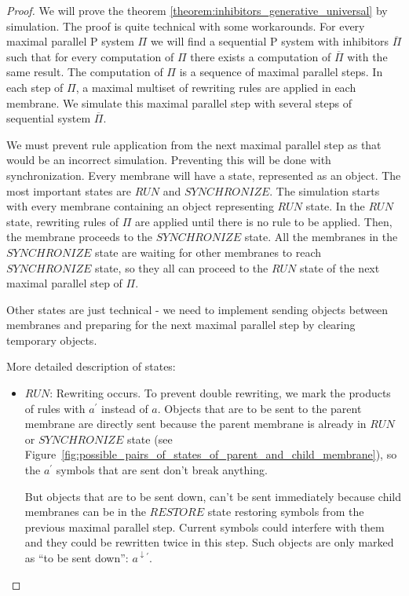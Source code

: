


\begin{proof}
  We will prove the theorem \ref{theorem:inhibitors_generative_universal} by simulation.
  The proof is quite technical with some workarounds.
  For every maximal parallel P system $\Pi$ we will find a sequential P system with inhibitors $\overline{\Pi}$ such that for every computation of $\Pi$ there exists a computation of $\overline{\Pi}$ with the same result.
  The computation of $\Pi$ is a sequence of maximal parallel steps.
  In each step of $\Pi$, a maximal multiset of rewriting rules are applied in each membrane.
  We simulate this maximal parallel step with several steps of sequential system $\overline{\Pi}$.

  We must prevent rule application from the next maximal parallel step as that would be an incorrect simulation.
  Preventing this will be done with synchronization.
  Every membrane will have a state, represented as an object.
  The most important states are $RUN$ and $SYNCHRONIZE$.
  The simulation starts with every membrane containing an object representing $RUN$ state.
  In the $RUN$ state, rewriting rules of $\Pi$ are applied until there is no rule to be applied. Then, the membrane proceeds to the $SYNCHRONIZE$ state.
  All the membranes in the $SYNCHRONIZE$ state are waiting for other membranes to reach $SYNCHRONIZE$ state, so they all can proceed to the $RUN$ state of the next maximal parallel step of $\Pi$.

  Other states are just technical - we need to implement sending objects between membranes and preparing for the next maximal parallel step by clearing temporary objects.

  More detailed description of states:
  

  \begin{itemize}
    \item $RUN$: Rewriting occurs.
    To prevent double rewriting, we mark the products of rules with $a^{\prime}$ instead of $a$.
    Objects that are to be sent to the parent membrane are directly sent because the parent membrane is already in $RUN$ or $SYNCHRONIZE$ state (see Figure~\ref{fig:possible_pairs_of_states_of_parent_and_child_membrane}), so the $a^{\prime}$ symbols that are sent don't break anything.
    
    But objects that are to be sent down, can't be sent immediately because child membranes can be in the $RESTORE$ state restoring symbols from the previous maximal parallel step. Current symbols could interfere with them and they could be rewritten twice in this step. Such objects are only marked as ``to be sent down'': $a^{\downarrow\prime}$.


\end{itemize}
\end{proof}
